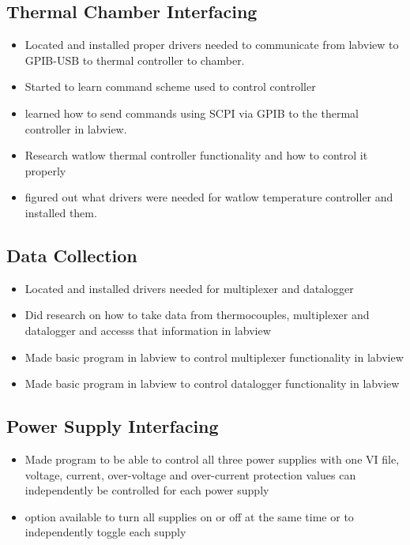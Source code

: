 \documentclass{article}
\begin{document}
\subsection*{Thermal Chamber Interfacing}
\begin{itemize}
    \item Located and installed proper drivers needed to communicate from labview to GPIB-USB to thermal controller to chamber.
    \item Started to learn command scheme used to control controller
    \item learned how to send commands using SCPI via GPIB to the thermal controller in labview.
    \item Research watlow thermal controller functionality and how to control it properly 
    \item figured out what drivers were needed for watlow temperature controller and installed them.
\end{itemize}
\subsection*{Data Collection}
\begin{itemize}
    \item Located and installed drivers needed for multiplexer and datalogger
    \item Did research on how to take data from thermocouples, multiplexer and datalogger and accesss that information in labview
    \item Made basic program in labview to control multiplexer functionality in labview
    \item Made basic program in labview to control datalogger functionality in labview
\end{itemize}
\subsection*{Power Supply Interfacing}
\begin{itemize}
    \item Made program to be able to control all three power supplies with one VI file, voltage, current, over-voltage and over-current protection values can independently be controlled for each power supply
    \item option available to turn all supplies on or off at the same time or to independently toggle each supply
\end{itemize}
\end{document}
